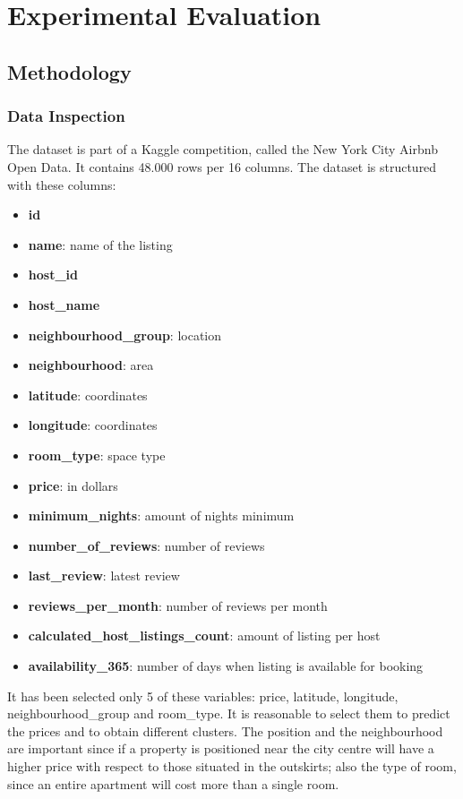 \documentclass{FR16}
\begin{document}
\newpage
\section{Experimental Evaluation}

\subsection{Methodology}
\subsubsection{Data Inspection}
The dataset is part of a Kaggle competition, called the New York City Airbnb Open Data. It contains 48.000 rows per 16 columns.
The dataset is structured with these columns: 
\begin{itemize}
\itemsep0em 
\item \textbf{id}
\item \textbf{name}: name of the listing
\item \textbf{host\_id}
\item \textbf{host\_name}
\item \textbf{neighbourhood\_group}: location
\item \textbf{neighbourhood}: area
\item \textbf{latitude}: coordinates
\item \textbf{longitude}: coordinates
\item \textbf{room\_type}: space type
\item \textbf{price}:  in dollars
\item \textbf{minimum\_nights}: amount of nights minimum
\item \textbf{number\_of\_reviews}: number of reviews
\item \textbf{last\_review}: latest review
\item \textbf{reviews\_per\_month}: number of reviews per month
\item \textbf{calculated\_host\_listings\_count}: amount of listing per host
\item  \textbf{availability\_365}: number of days when listing is available for booking\\
\end{itemize}
It has been selected only 5 of these variables: price, latitude, longitude, neighbourhood\_group and room\_type. It is reasonable to select them to predict the prices and to obtain different clusters. The position and the neighbourhood are important since if a property is positioned near the city centre will have a higher price with respect to those situated in the outskirts; also the type of room, since an entire apartment will cost more than a single room. \\\\
\end{document}
